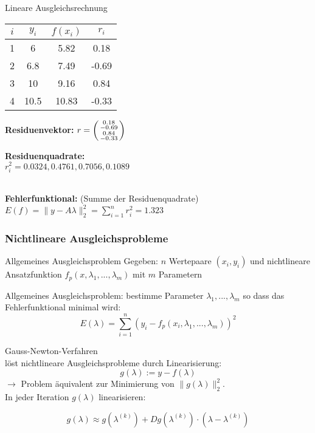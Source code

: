 \begin{example2}{Lineare Ausgleichsrechnung}
\begin{minipage}{0.5\linewidth}
\begin{tabular}{|c|c|c|c|}
\hline
$i$ & $y_i$ & $f(x_i)$ & $r_i$\\
\hline
1 & 6 & 5.82 & 0.18\\
2 & 6.8 & 7.49 & -0.69\\
3 & 10 & 9.16 & 0.84 \\
4 & 10.5 & 10.83 & -0.33 \\
\hline
\end{tabular}
\end{minipage}
\begin{minipage}{0.5\linewidth}
\textbf{Residuenvektor:} $r = \begin{psmallmatrix} 0.18 \\ -0.69 \\ 0.84 \\ -0.33 \end{psmallmatrix}$

\textbf{Residuenquadrate:} \\ $r_i^2 = 0.0324, 0.4761, 0.7056, 0.1089$
\end{minipage}
\vspace{1mm}\\
\textbf{Fehlerfunktional:} (Summe der Residuenquadrate)\\ 
$E(f) = \|y - A\lambda\|_2^2 = \sum_{i=1}^{n} r_i^2 = 1.323$
\end{example2}

\subsubsection{Nichtlineare Ausgleichsprobleme}

\begin{definition}{Allgemeines Ausgleichsproblem}
Gegeben: $n$ Wertepaare $(x_i, y_i)$ und nichtlineare Ansatzfunktion $f_p(x, \lambda_1, ..., \lambda_m)$ mit $m$ Parametern

Allgemeines Ausgleichsproblem: bestimme Parameter $\lambda_1, ..., \lambda_m$ so dass das Fehlerfunktional minimal wird:
\vspace{-3mm}\\
$$E(\lambda) = \sum_{i=1}^{n} (y_i - f_p(x_i, \lambda_1, ..., \lambda_m))^2$$
\end{definition}

\begin{concept}{Gauss-Newton-Verfahren}\\
löst nichtlineare Ausgleichsprobleme durch Linearisierung:
$$g(\lambda) := y - f(\lambda)$$
$\rightarrow$ Problem äquivalent zur Minimierung von $\|g(\lambda)\|_2^2$.
\vspace{2mm}\\
In jeder Iteration $g(\lambda)$ linearisieren:

$$g(\lambda) \approx g(\lambda^{(k)}) + Dg(\lambda^{(k)}) \cdot (\lambda - \lambda^{(k)})$$
\end{concept}

